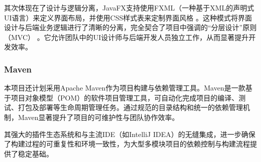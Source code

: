 其次体现在了设计与逻辑分离，JavaFX支持使用FXML（一种基于XML的声明式UI语言）来定义界面布局，并使用CSS样式表来定制界面风格 。这种模式将界面设计与后端业务逻辑进行了清晰的分离，完全契合了项目中强调的“分层设计”原则（MVC） 。它允许团队中的UI设计师与后端开发人员独立工作，从而显著提升开发效率。

\subsubsection{Maven}

本项目还计划采用Apache Maven作为项目构建与依赖管理工具。Maven是一款基于项目对象模型（POM）的软件项目管理工具，可自动化完成项目的编译、测试、打包及部署等生命周期管理任务。通过规范的目录结构和统一的依赖管理机制，Maven显著提升了项目的可维护性与团队协作效率。

其强大的插件生态系统和与主流IDE（如IntelliJ IDEA）的无缝集成，进一步确保了构建过程的可重复性和环境一致性，为大型多模块项目的依赖控制与构建流程提供了稳定基础。
